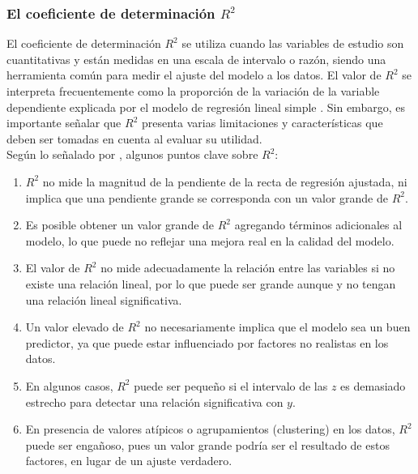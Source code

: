 \subsubsection{El coeficiente de determinación $R^{2}$}

El coeficiente de determinación $R^{2}$ se utiliza cuando las variables de estudio son cuantitativas y están medidas en una escala de intervalo o razón, siendo una herramienta común para medir el ajuste del modelo a los datos. El valor de $R^{2}$
se interpreta frecuentemente como la proporción de la variación de la variable dependiente explicada por el modelo de regresión lineal simple \parencite{balam-2012}. Sin embargo, es importante señalar que $R^{2}$
presenta varias limitaciones y características que deben ser tomadas en cuenta al evaluar su utilidad.\\


Según lo señalado por \textcite{balam-2012}, algunos puntos clave sobre $R^{2}$:\\

\begin{enumerate} 
	\item $R^{2}$ no mide la magnitud de la pendiente de la recta de regresión ajustada, ni implica que una pendiente grande se corresponda con un valor grande de $R^{2}$. 
	
	\item Es posible obtener un valor grande de $R^{2}$ agregando términos adicionales al modelo, lo que puede no reflejar una mejora real en la calidad del modelo.
	
	\item El valor de $R^{2}$  no mide adecuadamente la relación entre las variables si no existe una relación lineal, por lo que puede ser grande aunque 
	y no tengan una relación lineal significativa. 
	
	\item Un valor elevado de $R^{2}$ no necesariamente implica que el modelo sea un buen predictor, ya que puede estar influenciado por factores no realistas en los datos.
	
	\item En algunos casos, $R^{2}$ puede ser pequeño si el intervalo de las $z$  es demasiado estrecho para detectar una relación significativa con $y$. 
	
	\item En presencia de valores atípicos o agrupamientos (clustering) en los datos, $R^{2}$ puede ser engañoso, pues un valor grande podría ser el resultado de estos factores, en lugar de un ajuste verdadero. \\
\end{enumerate}


